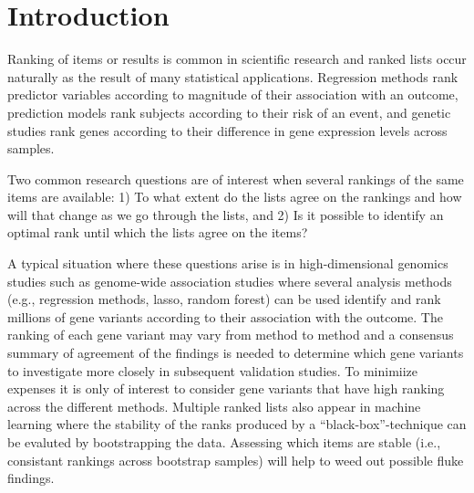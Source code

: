 \documentclass[oupdraft]{bio}
\newcommand{\added}[1]{{\color{added}{}#1}}
\begin{document}

\section{Introduction}

Ranking of items or results is common in scientific research and
ranked lists occur naturally as the result of many statistical
applications. Regression methods rank predictor variables according to
magnitude of their association with an outcome, prediction models rank
subjects according to their risk of an event, and genetic studies rank
genes according to their difference in gene expression levels across
samples.  \added{Two common research questions are of interest when
  several rankings of the same items are available: 1) To what extent
  do the lists agree on the rankings and how will that change as we go
  through the lists, and 2) Is it possible to identify an optimal rank
  until which the lists agree on the items?

  A typical situation where these questions arise is in
  high-dimensional genomics studies such as genome-wide association
  studies where several analysis methods (e.g., regression methods,
  lasso, random forest) can be used identify and rank millions of gene
  variants according to their association with the outcome. The
  ranking of each gene variant may vary from method to method and a
  consensus summary of agreement of the findings is needed to
  determine which gene variants to investigate more closely in
  subsequent validation studies. To minimiize expenses it is only of
  interest to consider gene variants that have high ranking across the
  different methods.  Multiple ranked lists also appear in machine
  learning where the stability of the ranks produced by a
  ``black-box''-technique can be evaluted by bootstrapping the
  data. Assessing which items are stable (i.e., consistant rankings
  across bootstrap samples) will help to weed out possible fluke
  findings.}
\end{document}
